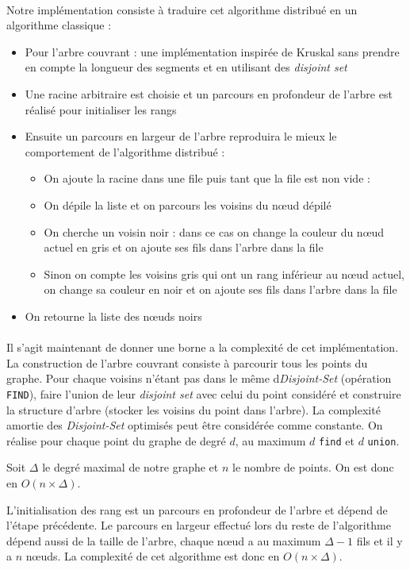\paragraph{}
Notre implémentation consiste à traduire cet algorithme distribué en un algorithme classique :
\begin{itemize}
\item Pour l'arbre couvrant : une implémentation inspirée de Kruskal sans prendre en compte la longueur des segments et en utilisant des \textit{disjoint set}
\item Une racine arbitraire est choisie et un parcours en profondeur de l'arbre est réalisé pour initialiser les rangs
\item Ensuite un parcours en largeur de l'arbre reproduira le mieux le comportement de l'algorithme distribué :
	\begin{itemize}
	\item On ajoute la racine dans une file puis tant que la file est non vide :
	\item On dépile la liste et on parcours les voisins du nœud dépilé
	\item On cherche un voisin noir : dans ce cas on change la couleur du nœud actuel en gris et on ajoute ses fils dans l'arbre dans la file
	\item Sinon on compte les voisins gris qui ont un rang inférieur au nœud actuel, on change sa couleur en noir et on ajoute ses fils dans l'arbre dans la file 
	\end{itemize}
\item On retourne la liste des nœuds noirs
\end{itemize}

\paragraph{}
Il s'agit maintenant de donner une borne a la complexité de cet implémentation.
La construction de l'arbre couvrant consiste à parcourir tous les points du graphe. Pour chaque voisins n'étant pas dans le même d\textit{Disjoint-Set} (opération \verb?FIND?), faire l'union de leur \textit{disjoint set} avec celui du point considéré et construire la structure d'arbre (stocker les voisins du point dans l'arbre).
La complexité amortie des \textit{Disjoint-Set} optimisés peut être considérée comme constante. On réalise pour chaque point du graphe de degré $d$, au maximum $d$ \verb?find? et $d$ \verb?union?.

Soit $\Delta$ le degré maximal de notre graphe et $n$ le nombre de points. On est donc en $O(n \times \Delta)$.

L'initialisation des rang est un parcours en profondeur de l'arbre et dépend de l'étape précédente.
Le parcours en largeur effectué lors du reste de l'algorithme dépend aussi de la taille de l'arbre, chaque nœud a au maximum $\Delta-1$ fils et il y a $n$ nœuds.
La complexité de cet algorithme est donc en $O(n \times \Delta)$.
